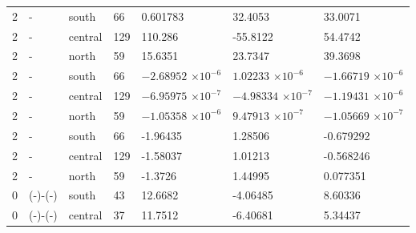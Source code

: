 \begin{longtable}
{}2 & \allowbreak{}-\allowbreak{} & south & 66 & 0.601783 & 32.4053 & 33.0071 \\
{}2 & \allowbreak{}-\allowbreak{} & central & 129 & 110.286 & -55.8122 & 54.4742 \\
{}2 & \allowbreak{}-\allowbreak{} & north & 59 & 15.6351 & 23.7347 & 39.3698 \\
{}2 & \allowbreak{}-\allowbreak{} & south & 66 &  &  &  \\
{}2 & \allowbreak{}-\allowbreak{} & central & 129 &  &  &  \\
{}2 & \allowbreak{}-\allowbreak{} & north & 59 &  &  &  \\
{}2 & \allowbreak{}-\allowbreak{} & south & 66 & -1.96435 & 1.28506 & -0.679292 \\
{}2 & \allowbreak{}-\allowbreak{} & central & 129 & -1.58037 & 1.01213 & -0.568246 \\
{}2 & \allowbreak{}-\allowbreak{} & north & 59 & -1.3726 & 1.44995 & 0.077351 \\
{}0 & (\allowbreak{}-\allowbreak{})-(\allowbreak{}-\allowbreak{}) & south & 43 & 12.6682 & -4.06485 & 8.60336 \\
{}0 & (\allowbreak{}-\allowbreak{})-(\allowbreak{}-\allowbreak{}) & central & 37 & 11.7512 & -6.40681 & 5.34437 \\

\end{longtable}
